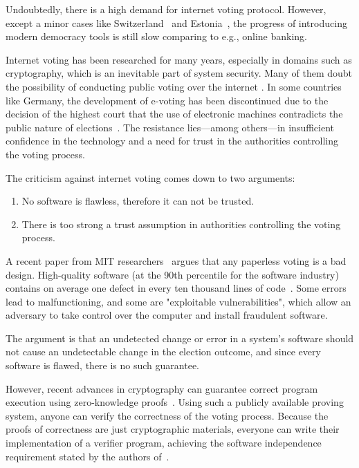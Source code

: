 \documentclass[runningheads]{llncs}
\begin{document}
Undoubtedly, there is a high demand for internet voting protocol. However, except a minor cases like Switzerland~\cite{ElectronicVotingSwitzerland2023} and Estonia~\cite{ElectronicVotingEstonia2023}, the progress of introducing modern democracy tools is still slow comparing to e.g., online banking.

Internet voting has been researched for many years, especially in domains such as cryptography, which is an inevitable part of system security. Many of them doubt the possibility of conducting public voting over the internet \cite{parkGoingBadWorse2021, mearianWhyBlockchainbasedVoting2019, shanklandNoBlockchainIsn2018, leeBlockchainbasedElectionsWould2018, schneierBlockchainVoting2020, schneierBlockchainTrust2019}. In some countries like Germany, the development of e-voting has been discontinued due to the decision of the highest court that the use of electronic machines contradicts the public nature of elections~\cite{ElectronicVotingCountry2023}. The resistance lies—among others—in insufficient confidence in the technology and a need for trust in the authorities controlling the voting process.

The criticism against internet voting comes down to two arguments:

\begin{enumerate}
    \item No software is flawless, therefore it can not be trusted.
    \item There is too strong a trust assumption in authorities controlling the voting process.
\end{enumerate}

A recent paper from MIT researchers~\cite{parkGoingBadWorse2021} argues that any paperless voting is a bad design. High-quality software (at the 90th percentile for the software industry) contains on average one defect in every ten thousand lines of code~\cite{llaguno2017CoverityScan2017}. Some errors lead to malfunctioning, and some are "exploitable vulnerabilities", which allow an adversary to take control over the computer and install fraudulent software.

The argument is that an undetected change or error in a system's software should not cause an undetectable change in the election outcome, and since every software is flawed, there is no such guarantee.

However, recent advances in cryptography can guarantee correct program execution using zero-knowledge proofs~\cite{parnoPinocchioNearlyPractical2013}. Using such a publicly available proving system, anyone can verify the correctness of the voting process. Because the proofs of correctness are just cryptographic materials, everyone can write their implementation of a verifier program, achieving the software independence requirement stated by the authors of~\cite{parkGoingBadWorse2021}.
\end{document}
